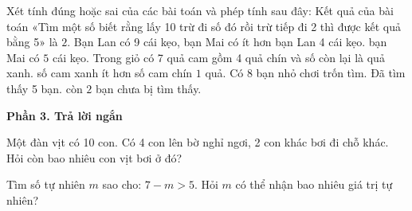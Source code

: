 \begin{ex} %
Xét tính đúng hoặc sai của các bài toán và phép tính sau đây:
\choiceTF
{Kết quả của bài toán «Tìm một số biết rằng lấy 10 trừ đi số đó rồi trừ tiếp đi 2 thì được kết quả bằng 5» là $2$.}
{\True Bạn Lan có 9 cái kẹo, bạn Mai có ít hơn bạn Lan 4 cái kẹo. bạn Mai có $5$ cái kẹo.}
{\True Trong giỏ có 7 quả cam gồm 4 quả chín và số còn lại là quả xanh. số cam xanh ít hơn số cam chín $1$ quả.}
{Có 8 bạn nhỏ chơi trốn tìm. Đã tìm thấy 5 bạn. còn $2$ bạn chưa bị tìm thấy.}
\end{ex}

\textbf{Phần 3. Trả lời ngắn}

\begin{ex} %
Một đàn vịt có 10 con. Có 4 con lên bờ nghỉ ngơi, 2 con khác bơi đi chỗ khác. Hỏi còn bao nhiêu con vịt bơi ở đó?
\end{ex}

\begin{ex} %
Tìm số tự nhiên $m$ sao cho: $7 - m > 5$. Hỏi $m$ có thể nhận bao nhiêu giá trị tự nhiên?
\end{ex}

